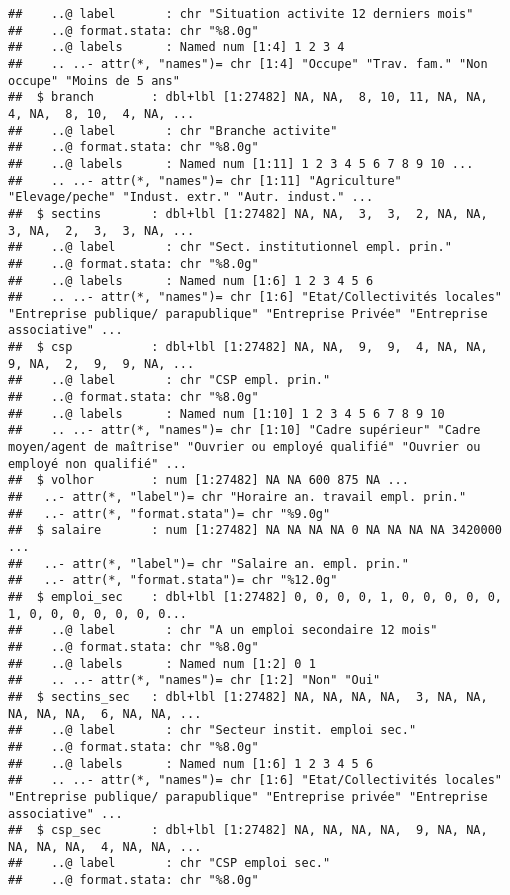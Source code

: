 \documentclass[
]{article}
\begin{document}
\begin{verbatim}
##    ..@ label       : chr "Situation activite 12 derniers mois"
##    ..@ format.stata: chr "%8.0g"
##    ..@ labels      : Named num [1:4] 1 2 3 4
##    .. ..- attr(*, "names")= chr [1:4] "Occupe" "Trav. fam." "Non occupe" "Moins de 5 ans"
##  $ branch        : dbl+lbl [1:27482] NA, NA,  8, 10, 11, NA, NA,  4, NA,  8, 10,  4, NA, ...
##    ..@ label       : chr "Branche activite"
##    ..@ format.stata: chr "%8.0g"
##    ..@ labels      : Named num [1:11] 1 2 3 4 5 6 7 8 9 10 ...
##    .. ..- attr(*, "names")= chr [1:11] "Agriculture" "Elevage/peche" "Indust. extr." "Autr. indust." ...
##  $ sectins       : dbl+lbl [1:27482] NA, NA,  3,  3,  2, NA, NA,  3, NA,  2,  3,  3, NA, ...
##    ..@ label       : chr "Sect. institutionnel empl. prin."
##    ..@ format.stata: chr "%8.0g"
##    ..@ labels      : Named num [1:6] 1 2 3 4 5 6
##    .. ..- attr(*, "names")= chr [1:6] "Etat/Collectivités locales" "Entreprise publique/ parapublique" "Entreprise Privée" "Entreprise associative" ...
##  $ csp           : dbl+lbl [1:27482] NA, NA,  9,  9,  4, NA, NA,  9, NA,  2,  9,  9, NA, ...
##    ..@ label       : chr "CSP empl. prin."
##    ..@ format.stata: chr "%8.0g"
##    ..@ labels      : Named num [1:10] 1 2 3 4 5 6 7 8 9 10
##    .. ..- attr(*, "names")= chr [1:10] "Cadre supérieur" "Cadre moyen/agent de maîtrise" "Ouvrier ou employé qualifié" "Ouvrier ou employé non qualifié" ...
##  $ volhor        : num [1:27482] NA NA 600 875 NA ...
##   ..- attr(*, "label")= chr "Horaire an. travail empl. prin."
##   ..- attr(*, "format.stata")= chr "%9.0g"
##  $ salaire       : num [1:27482] NA NA NA NA 0 NA NA NA NA 3420000 ...
##   ..- attr(*, "label")= chr "Salaire an. empl. prin."
##   ..- attr(*, "format.stata")= chr "%12.0g"
##  $ emploi_sec    : dbl+lbl [1:27482] 0, 0, 0, 0, 1, 0, 0, 0, 0, 0, 1, 0, 0, 0, 0, 0, 0, 0...
##    ..@ label       : chr "A un emploi secondaire 12 mois"
##    ..@ format.stata: chr "%8.0g"
##    ..@ labels      : Named num [1:2] 0 1
##    .. ..- attr(*, "names")= chr [1:2] "Non" "Oui"
##  $ sectins_sec   : dbl+lbl [1:27482] NA, NA, NA, NA,  3, NA, NA, NA, NA, NA,  6, NA, NA, ...
##    ..@ label       : chr "Secteur instit. emploi sec."
##    ..@ format.stata: chr "%8.0g"
##    ..@ labels      : Named num [1:6] 1 2 3 4 5 6
##    .. ..- attr(*, "names")= chr [1:6] "Etat/Collectivités locales" "Entreprise publique/ parapublique" "Entreprise privée" "Entreprise associative" ...
##  $ csp_sec       : dbl+lbl [1:27482] NA, NA, NA, NA,  9, NA, NA, NA, NA, NA,  4, NA, NA, ...
##    ..@ label       : chr "CSP emploi sec."
##    ..@ format.stata: chr "%8.0g"

\end{verbatim}
\end{document}
